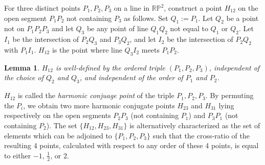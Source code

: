 \documentclass[12pt]{article}
\numberwithin{equation}{section}
\theoremstyle{plain}
\newtheorem{lemma}[definition]{Lemma}
\theoremstyle{definition}
\newcommand{\RP}{\mathbb{RP}}
\begin{document}
For three distinct points $P_1,P_2,P_3$ on a line in $\RP^{2}$, construct a point $H_{12}$ on the open segment $P_1P_2$ not containing $P_3$ as follows. Set $Q_1:=P_1$. Let $Q_2$ be a point not on $P_1P_2P_3$ and let $Q_3$ be any point of line $Q_1Q_2$ not equal to $Q_1$ or $Q_2$. Let $I_1$ be the intersection of $P_2Q_3$ and $P_3Q_2$, and let $I_2$ be the intersection of $P_2Q_2$ with $P_1I_1$. $H_{12}$ is the point where line $Q_3I_2$ meets $P_1P_2$.

\begin{lemma} $H_{12}$ is well-defined by the ordered triple $(P_1,P_2,P_3)$, independent of the choice of $Q_{2}$ and $Q_{3}$, and independent of the order of $P_1$ and $P_2$.
\end{lemma}

$H_{12}$ is called the \emph{harmonic conjuage point} of the triple $P_1,P_2,P_3$. By permuting the $P_i$, we obtain two more harmonic conjugate points $H_{23}$ and $H_{31}$ lying respectively on the open segments $P_2P_3$ (not containing $P_1$) and $P_3P_1$ (not containing $P_2$). The set $\{H_{12},H_{23},H_{31}\}$ is alternatively characterized as the set of elements which can be adjoined to $\{P_1,P_2,P_3\}$ such that the cross-ratio of the resulting 4 points, calculated with respect to any order of these 4 points, is equal to either $-1$, $\tfrac{1}{2}$, or $2$.
\end{document}
